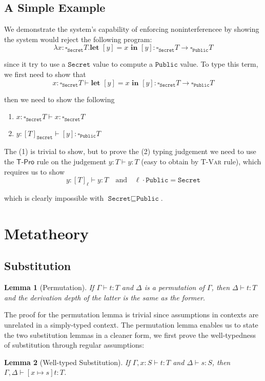 \documentclass[conference]{IEEEtran}
\newcommand\lam[2]{\lambda #1.#2}
\newcommand\gradedt[2]{\square_#1 #2}
\newcommand\public{\texttt{Public}}
\newcommand\secret{\texttt{Secret}}
\newtheorem{lemma}{Lemma}
\begin{document}
\subsection{A Simple Example}

We demonstrate the system's capability of enforcing noninterferencee by showing the system would reject the following program:
$$
\lam{x:\gradedt{\secret}{T}}{\textbf{let }[y]=x\textbf{ in }[y]}:\gradedt{\secret}{T}\to\gradedt{\public}{T}
$$

since it try to use a $\secret$ value to compute a $\public$ value. To type this term, we first need to show that
$$
x:\gradedt{\secret}{T}\vdash \textbf{let }[y]=x\textbf{ in }[y]:\gradedt{\secret}{T}\to\gradedt{\public}{T}
$$

then we need to show the following
\begin{enumerate}
	\item $x:\gradedt{\secret}{T}\vdash x:\gradedt{\secret}{T}$ 
	\item $y:[T]_\secret\vdash [y]:\gradedt{\public}{T}$
\end{enumerate}

The (1) is trivial to show, but to prove the (2) typing judgement we need to use the $\textsf{T-Pro}$ rule on the judgement $y:T\vdash y:T$ (easy to obtain by \textsc{T-Var} rule), which requires us to show
$$
y:[T]_\ell\vdash y:T\quad\text{and}\quad \ell\cdot\texttt{Public}=\texttt{Secret}
$$

which is clearly impossible with $\texttt{Secret}\sqsubseteq\texttt{Public}$.

\section{Metatheory}
\subsection{Substitution}
\label{lem-perm}
\begin{lemma}[Permutation]
	If $\Gamma\vdash t:T$ and $\Delta$ is a permutation of $\Gamma$, then $\Delta\vdash t:T$ and the derivation depth of the latter is the same as the former.
\end{lemma}
The proof for the permutation lemma is trivial since assumptions in contexts are unrelated in a simply-typed context. The permutation lemma enables us to state the two substitution lemmas in a cleaner form, we first prove the well-typedness of substitution through regular assumptions:
\begin{lemma}[Well-typed Substitution] 
	If $\Gamma,x:S\vdash t:T$ and $\Delta\vdash s:S$, then $\Gamma,\Delta\vdash [x\mapsto s]t:T$.
\end{lemma}
\end{document}
